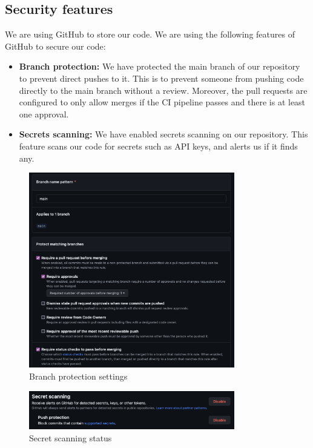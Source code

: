 \documentclass[12pt,x11names]{article}
\begin{document}
\subsection{Security features}

We are using GitHub to store our code. We are using the following features of GitHub to
secure our code:

\begin{itemize}
    \item \textbf{Branch protection:} We have protected the main branch of our repository
    to prevent direct pushes to it. This is to prevent someone from pushing code directly
    to the main branch without a review. Moreover, the pull requests are configured to
    only allow merges if the CI pipeline passes and there is at least one approval.
    \item \textbf{Secrets scanning:} We have enabled secrets scanning on our repository.
    This feature scans our code for secrets such as API keys, and alerts us if it finds
    any.
\end{itemize}

\begin{figure}[H]
  \centering
  \includegraphics[width=0.8\textwidth]{imgs/branch_protection.png}
  \caption{Branch protection settings}
\end{figure}

\begin{figure}[H]
  \centering
  \includegraphics[width=0.8\textwidth]{imgs/secret_scanning.png}
  \caption{Secret scanning status}
\end{figure}
\end{document}
